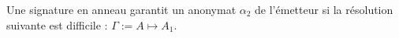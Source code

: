 \begin{comment}
\begin{proposition}
    Soient deux agents $A_1$,$A_2$ et un ensemble d'agents 
    A ($A_1 \in A$ et $A_2 \notin A)$\\
    $A_1$ envoie un message à $A_2$ via une signature en anneau : 
    $A \rightarrow A_2$\\
    Une signature en anneau garantit un anonymat $\alpha_5$ de l'émetteur si 
    $\forall a \in A, p(a \rightarrow A_2)$ est équiprobable. 
\end{proposition}
\end{comment}

\begin{proposition}
    Une signature en anneau garantit un anonymat $\alpha_2$ de l'émetteur si
    la résolution suivante est difficile : 
    $\Gamma := A \mapsto A_1$. 
\end{proposition}

\begin{comment}
    Another downside to the original CryptoNote set-up is that it requires a given
    pair of (P, A) of pubkey P and amount A to be used in a ring signature with other
    pubkeys having the same amount. For less common amounts, this means there may
    be a smaller number of potential pairs (P ′, A′) available on the blockchain with
    A′ = A to ring signature with. Thus, in the original CryptoNote protocol, the
    potential anonymity set is perhaps smaller than may be desired. Analysis of the
    above weaknesses is covered in [9]
\end{comment}